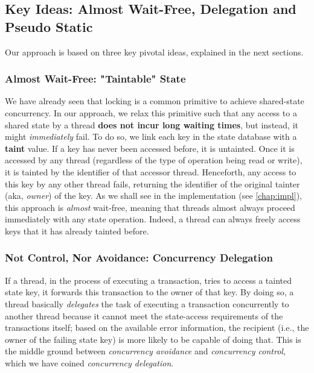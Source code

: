 \subsection{Key Ideas: Almost Wait-Free, Delegation and Pseudo Static}

Our approach is based on three key pivotal ideas, explained in the next sections.

\subsubsection{Almost Wait-Free: "Taintable" State}\label{chapt_approach:subsubsec:taintable_state}

We have already seen that locking is a common primitive to achieve shared-state concurrency. In our
approach, we relax this primitive such that any access to a shared state by a thread \textbf{does
not incur long waiting times}, but instead, it might \textit{immediately} fail. To do so, we link
each key in the state database with a \textbf{taint} value. If a key has never been accessed before,
it is untainted. Once it is accessed by any thread (regardless of the type of operation being read
or write), it is tainted by the identifier of that accessor thread. Henceforth, any access to this
key by any other thread fails, returning the identifier of the original tainter (aka,
\textit{owner}) of the key. As we shall see in the implementation (see \ref{chap:impl}), this
approach is \textit{almost} wait-free, meaning that threads almost always proceed immediately with
any state operation. Indeed, a thread can always freely access keys that it has already tainted
before.

\subsubsection{Not Control, Nor Avoidance: Concurrency Delegation}

If a thread, in the process of executing a transaction, tries to access a tainted state key, it
forwards this transaction to the owner of that key. By doing so, a thread basically
\textit{delegates} the task of executing a transaction concurrently to another thread because it
cannot meet the state-access requirements of the transactions itself; based on the available error
information, the recipient (i.e., the owner of the failing state key) is more likely to be capable
of doing that. This is the middle ground between \textit{concurrency avoidance} and
\textit{concurrency control}, which we have coined \textit{concurrency delegation}.

